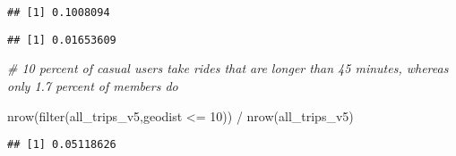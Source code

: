 \documentclass[
]{article}
\newenvironment{Shaded}{\begin{snugshade}}{\end{snugshade}}
\newcommand{\CommentTok}[1]{\textcolor[rgb]{0.56,0.35,0.01}{\textit{#1}}}
\newcommand{\DecValTok}[1]{\textcolor[rgb]{0.00,0.00,0.81}{#1}}
\newcommand{\FunctionTok}[1]{\textcolor[rgb]{0.00,0.00,0.00}{#1}}
\newcommand{\NormalTok}[1]{#1}
\newcommand{\SpecialCharTok}[1]{\textcolor[rgb]{0.00,0.00,0.00}{#1}}
\newcommand{\StringTok}[1]{\textcolor[rgb]{0.31,0.60,0.02}{#1}}
\begin{document}
\begin{verbatim}
## [1] 0.1008094
\end{verbatim}

\begin{Shaded}
\end{Shaded}

\begin{verbatim}
## [1] 0.01653609
\end{verbatim}

\begin{Shaded}
\begin{Highlighting}[]
\CommentTok{\# 10 percent of casual users take rides that are longer than 45 minutes, whereas only 1.7 percent of members do}

\FunctionTok{nrow}\NormalTok{(}\FunctionTok{filter}\NormalTok{(all\_trips\_v5,geodist }\SpecialCharTok{\textless{}=} \DecValTok{10}\NormalTok{)) }\SpecialCharTok{/} \FunctionTok{nrow}\NormalTok{(all\_trips\_v5)}
\end{Highlighting}
\end{Shaded}

\begin{verbatim}
## [1] 0.05118626
\end{verbatim}

\begin{Shaded}
\end{Shaded}
\end{document}
